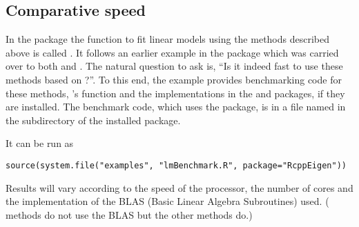 \documentclass[shortnames,article]{jss}
\begin{document}
\subsection{Comparative speed}

In the  package the  function to fit linear
models using the methods described above is called . It follows
an earlier example in the  package which was carried over to both
 and . The natural question to ask is, ``Is it indeed fast to use these methods
based on ?''.  To this end, the example provides benchmarking code for these
methods, 's  function and the 
implementations in the  \citep{CRAN:RcppArmadillo}
and  \citep{CRAN:RcppGSL} packages, if they are
installed.  The benchmark code, which uses the 
\citep{CRAN:rbenchmark} package, is in a file named
 in the  subdirectory of the
installed  package.


It can be run as
\begin{verbatim}
source(system.file("examples", "lmBenchmark.R", package="RcppEigen"))
\end{verbatim}
Results will vary according to the speed of the processor, the
number of cores and the implementation of the BLAS (Basic Linear
Algebra Subroutines) used.  ( methods do not use the BLAS
but the other methods do.)  
\end{document}
